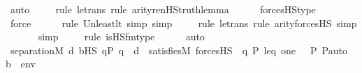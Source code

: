 \begin{isabellebody}
\ auto{\isacharbrackleft}{\kern0pt}{}{\isacharbrackright}{\kern0pt}\isanewline
\ \ \ \ \isamarkupfalse%
{\isacharparenleft}{\kern0pt}rule\ le{\isacharunderscore}{\kern0pt}trans{\isacharcomma}{\kern0pt}\ rule\ arity{\isacharunderscore}{\kern0pt}ren{\isacharunderscore}{\kern0pt}HS{\isacharunderscore}{\kern0pt}truth{\isacharunderscore}{\kern0pt}lemma{\isacharparenright}{\kern0pt}\isanewline
\ \ \ \ \isamarkupfalse%
\ forcesHS{\isacharunderscore}{\kern0pt}type\ \isanewline
\ \ \ \ \ \isamarkupfalse%
\ force\ \isanewline
\ \ \ \ \isamarkupfalse%
{\isacharparenleft}{\kern0pt}rule\ Un{\isacharunderscore}{\kern0pt}least{\isacharunderscore}{\kern0pt}lt{\isacharcomma}{\kern0pt}\ simp{\isacharcomma}{\kern0pt}\ simp{\isacharparenright}{\kern0pt}\isanewline
\ \ \ \ \isamarkupfalse%
{\isacharparenleft}{\kern0pt}rule\ le{\isacharunderscore}{\kern0pt}trans{\isacharcomma}{\kern0pt}\ rule\ arity{\isacharunderscore}{\kern0pt}forcesHS{\isacharcomma}{\kern0pt}\ simp{\isacharparenright}{\kern0pt}\isanewline
\ \ \ \ \ \isamarkupfalse%
\ simp\isanewline
\ \ \ \ \isamarkupfalse%
{\isacharparenleft}{\kern0pt}rule\ is{\isacharunderscore}{\kern0pt}HS{\isacharunderscore}{\kern0pt}fm{\isacharunderscore}{\kern0pt}type{\isacharparenright}{\kern0pt}\isanewline
\ \ \ \ \isamarkupfalse%
\ auto\isanewline
\ \ \isamarkupfalse%
\ \isamarkupfalse%
\ {\isachardoublequoteopen}separation{\isacharparenleft}{\kern0pt}{\isacharhash}{\kern0pt}{\isacharhash}{\kern0pt}M{\isacharcomma}{\kern0pt}\ {\isasymlambda}d{\isachardot}{\kern0pt}\ {\isasymexists}b{\isasymin}HS{\isachardot}{\kern0pt}\ {\isasymforall}q{\isasymin}P{\isachardot}{\kern0pt}\ q\ {\isasympreceq}\ d\ {\isasymlongrightarrow}\ satisfies{\isacharparenleft}{\kern0pt}M{\isacharcomma}{\kern0pt}\ forcesHS{\isacharparenleft}{\kern0pt}{\isasymphi}{\isacharparenright}{\kern0pt}{\isacharparenright}{\kern0pt}\ {\isacharbackquote}{\kern0pt}\ {\isacharparenleft}{\kern0pt}{\isacharbrackleft}{\kern0pt}q{\isacharcomma}{\kern0pt}\ P{\isacharcomma}{\kern0pt}\ leq{\isacharcomma}{\kern0pt}\ one{\isacharcomma}{\kern0pt}\ {\isasymlangle}{\isasymF}{\isacharcomma}{\kern0pt}\ {\isasymG}{\isacharcomma}{\kern0pt}\ P{\isacharcomma}{\kern0pt}\ P{\isacharunderscore}{\kern0pt}auto{\isasymrangle}{\isacharbrackright}{\kern0pt}\ {\isacharat}{\kern0pt}\ {\isacharbrackleft}{\kern0pt}b{\isacharbrackright}{\kern0pt}\ {\isacharat}{\kern0pt}\ env{\isacharparenright}{\kern0pt}\ {\isasymnoteq}\ {}{\isacharparenright}{\kern0pt}{\isachardoublequoteclose}\ \isanewline

\end{isabellebody}
